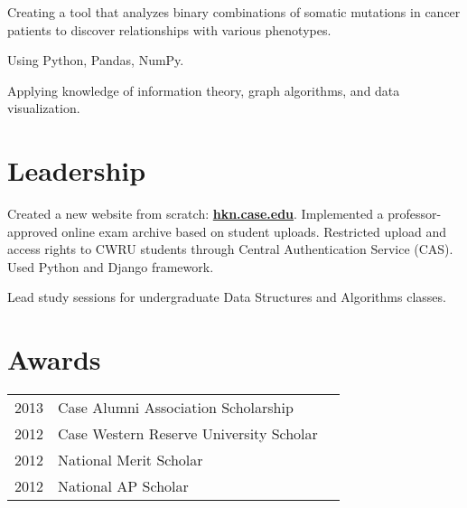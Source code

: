 \documentclass[letterpaper]{deedy-resume} %
\begin{document}
\begin{minipage}[t]{0.66\textwidth}


\begin{tightitemize}
\item Creating a tool that analyzes binary combinations of somatic mutations in
  cancer patients to discover relationships with various phenotypes.
\item Using Python, Pandas, NumPy.
\item Applying knowledge of information theory, graph algorithms, and data
  visualization.
\end{tightitemize}

\sectionspace %


\section{Leadership}


\begin{tightitemize}
\item Created a new website from scratch:
  \textbf{\href{https://hkn.case.edu}{hkn.case.edu}}.  Implemented a
  professor-approved online exam archive based on student uploads.  Restricted
  upload and access rights to CWRU students through Central Authentication
  Service (CAS).  Used Python and Django framework.
\item Lead study sessions for undergraduate Data Structures and Algorithms
  classes.
\end{tightitemize}

\sectionspace %


\section{Awards}

\begin{tabular}{rll}
2013 & Case Alumni Association Scholarship \\
2012 & Case Western Reserve University Scholar \\
2012 & National Merit Scholar \\
2012 & National AP Scholar
\end{tabular}


\end{minipage}
\end{document}
